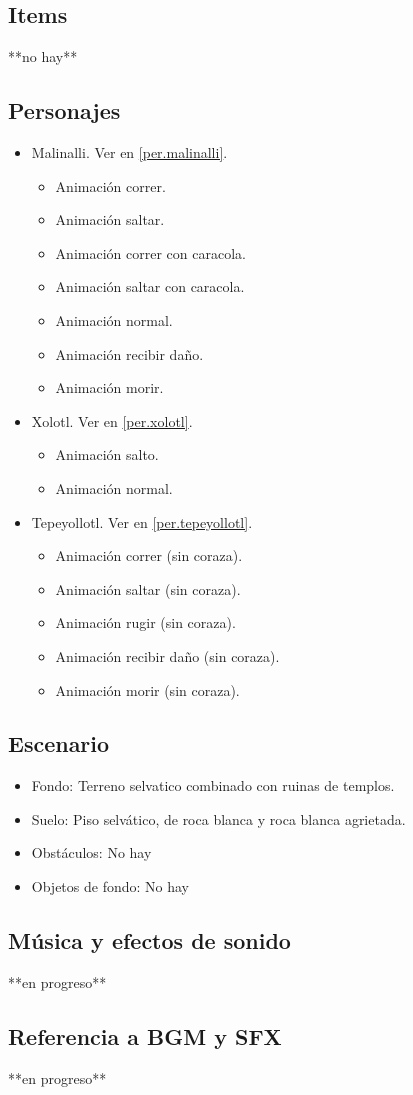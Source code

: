 	\subsection{Items}
	**no hay**
	\subsection{Personajes}
	\begin{itemize}
		\item Malinalli. Ver en \ref{per.malinalli}.
		\begin{itemize}
			\item Animación correr.
			\item Animación saltar.
			\item Animación correr con caracola.
			\item Animación saltar con caracola.
			\item Animación normal.
			\item Animación recibir daño.
			\item Animación morir.
		\end{itemize} 
		\item Xolotl. Ver en \ref{per.xolotl}.
		\begin{itemize}
				\item Animación salto.
				\item Animación normal.
		\end{itemize}
		\item Tepeyollotl. Ver en \ref{per.tepeyollotl}.
		\begin{itemize}
			\item Animación correr (sin coraza).
			\item Animación saltar (sin coraza).
			\item Animación rugir (sin coraza).
			\item Animación recibir daño (sin coraza).
			\item Animación morir (sin coraza).
		\end{itemize}
	\end{itemize}
	\subsection{Escenario}
\begin{itemize} 
	\item Fondo: Terreno selvatico combinado con ruinas de templos.
	\item Suelo: Piso selvático, de roca blanca y roca blanca agrietada.
	\item Obstáculos: No hay
	\item Objetos de fondo: No hay
\end{itemize}		
	\subsection{Música y efectos de sonido}
	**en progreso**
	\subsection{Referencia a BGM y SFX}
	**en progreso**
	